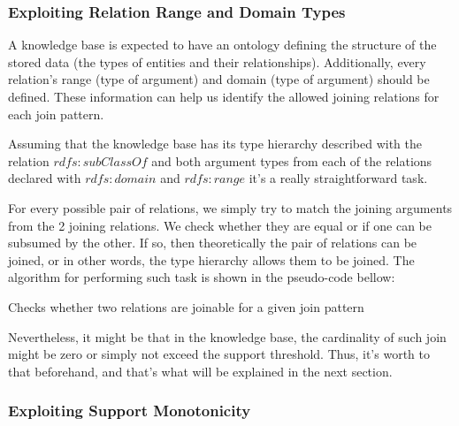 \subsubsection{Exploiting Relation Range and Domain Types}

A knowledge base is expected to have an ontology defining the structure of the stored data (the types of entities and
their relationships). Additionally, every relation's range (type of  argument) and domain (type of 
argument) should be defined. These information can help us identify the allowed joining relations for each join pattern.

Assuming that the knowledge base has its type hierarchy described with the relation $rdfs:subClassOf$ and both argument
types from each of the relations declared with $rdfs:domain$ and $rdfs:range$ it's a really straightforward task.

For every possible pair of relations, we simply try to match the joining arguments from the 2 joining relations. We
check whether they are equal or if one can be subsumed by the other. If so, then theoretically the pair of relations
can be joined, or in other words, the type hierarchy allows them to be joined. The algorithm for performing such task is
shown in the pseudo-code bellow:

\begin{algorithm}[!h]
 \caption{Checks whether two relations are joinable for a given join pattern}
 \label{alg1}
   {
  }
   {
  }
\end{algorithm}

Nevertheless, it might be that in the knowledge base, the cardinality of such join might be zero or simply not exceed
the support threshold. Thus, it's worth to that beforehand, and that's what will be explained in the next section.

\subsubsection{Exploiting Support Monotonicity}

